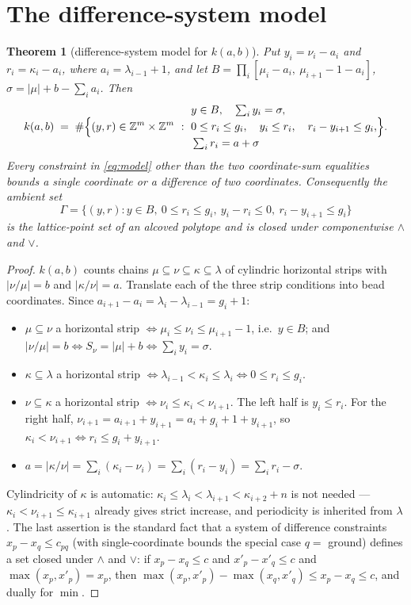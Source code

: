 \documentclass[11pt]{article}
\theoremstyle{plain}
\newtheorem{theorem}{Theorem}
\theoremstyle{definition}
\newcommand{\Z}{\mathbb{Z}}
\begin{document}
\section{The difference-system model}\label{sec:diffsys}

\begin{theorem}[difference-system model for $k(a,b)$]\label{thm:diffsys}
Put $y_i=\nu_i-a_i$ and $r_i=\kappa_i-a_i$, where $a_i=\lambda_{i-1}+1$, and let
$B=\prod_i[\mu_i-a_i,\ \mu_{i+1}-1-a_i]$, $\sigma=|\mu|+b-\sum_ia_i$. Then
\begin{equation}\label{eq:model}
  k(a,b)\;=\;\#\Bigl\{(y,r)\in\Z^m\times\Z^m\ :\
  \begin{aligned}
   &y\in B,\quad \textstyle\sum_i y_i=\sigma,\\
   &0\le r_i\le g_i,\quad y_i\le r_i,\quad r_i-y_{i+1}\le g_i,\\
   &\textstyle\sum_i r_i=a+\sigma
  \end{aligned}
  \Bigr\}.
\end{equation}
Every constraint in \eqref{eq:model} other than the two coordinate-sum equalities bounds
a single coordinate or a difference of two coordinates. Consequently the ambient set
\[
  \Gamma=\{(y,r):y\in B,\ 0\le r_i\le g_i,\ y_i-r_i\le0,\ r_i-y_{i+1}\le g_i\}
\]
is the lattice-point set of an alcoved polytope and is closed under componentwise
$\wedge$ and $\vee$.
\end{theorem}

\begin{proof}
$k(a,b)$ counts chains $\mu\subseteq\nu\subseteq\kappa\subseteq\lambda$ of cylindric
horizontal strips with $|\nu/\mu|=b$ and $|\kappa/\nu|=a$. Translate each of the three
strip conditions into bead coordinates. Since $a_{i+1}-a_i=\lambda_i-\lambda_{i-1}=g_i+1$:
\begin{itemize}
\item $\mu\subseteq\nu$ a horizontal strip $\iff\mu_i\le\nu_i\le\mu_{i+1}-1$, i.e.\
  $y\in B$; and $|\nu/\mu|=b\iff S_\nu=|\mu|+b\iff\sum_iy_i=\sigma$.
\item $\kappa\subseteq\lambda$ a horizontal strip $\iff\lambda_{i-1}<\kappa_i\le\lambda_i
  \iff 0\le r_i\le g_i$.
\item $\nu\subseteq\kappa$ a horizontal strip $\iff\nu_i\le\kappa_i<\nu_{i+1}$. The left
  half is $y_i\le r_i$. For the right half,
  $\nu_{i+1}=a_{i+1}+y_{i+1}=a_i+g_i+1+y_{i+1}$, so $\kappa_i<\nu_{i+1}\iff
  r_i\le g_i+y_{i+1}$.
\item $a=|\kappa/\nu|=\sum_i(\kappa_i-\nu_i)=\sum_i(r_i-y_i)=\sum_ir_i-\sigma$.
\end{itemize}
Cylindricity of $\kappa$ is automatic: $\kappa_i\le\lambda_i<\lambda_{i+1}<\kappa_{i+2}+n$
is not needed --- $\kappa_i<\nu_{i+1}\le\kappa_{i+1}$ already gives strict increase, and
periodicity is inherited from $\lambda$. The last assertion is the standard fact that a
system of difference constraints $x_p-x_q\le c_{pq}$ (with single-coordinate bounds the
special case $q=$ ground) defines a set closed under $\wedge$ and $\vee$: if
$x_p-x_q\le c$ and $x'_p-x'_q\le c$ and $\max(x_p,x'_p)=x_p$, then
$\max(x_p,x'_p)-\max(x_q,x'_q)\le x_p-x_q\le c$, and dually for $\min$.
\end{proof}
\end{document}
